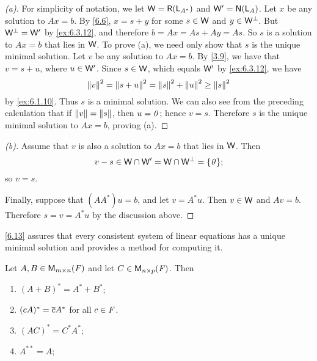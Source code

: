 \begin{proof}[(a)]
  For simplicity of notation, we let \(\W = \rg{\L_{A^*}}\) and \(\W' = \ns{\L_A}\).
  Let \(x\) be any solution to \(Ax = b\).
  By \cref{6.6}, \(x = s + y\) for some \(s \in \mathsf{W}\) and \(y \in \mathsf{W}^{\perp}\).
  But \(\mathsf{W}^{\perp} = \mathsf{W}'\) by \cref{ex:6.3.12}, and therefore \(b = Ax = As + Ay = As\).
  So \(s\) is a solution to \(Ax = b\) that lies in \(\mathsf{W}\).
  To prove (a), we need only show that \(s\) is the unique minimal solution.
  Let \(v\) be any solution to \(Ax = b\).
  By \cref{3.9}, we have that \(v = s + u\), where \(u \in \mathsf{W}'\).
  Since \(s \in \mathsf{W}\), which equals \(\mathsf{W}'\) by \cref{ex:6.3.12}, we have
  \[
    \left\lVert v\right\rVert^2 = \left\lVert s + u\right\rVert^2 = \left\lVert s\right\rVert^2 + \left\lVert u\right\rVert^2 \geq \left\lVert s\right\rVert^2
  \]
  by \cref{ex:6.1.10}.
  Thus \(s\) is a minimal solution.
  We can also see from the preceding calculation that if \(\left\lVert v\right\rVert = \left\lVert s\right\rVert\), then \(u = \mathit{0}\);
  hence \(v = s\).
  Therefore \(s\) is the unique minimal solution to \(Ax = b\), proving (a).
\end{proof}

\begin{proof}[(b)]
  Assume that \(v\) is also a solution to \(Ax = b\) that lies in \(\mathsf{W}\).
  Then
  \[
    v - s \in \W \cap \W' = \W \cap \W^{\perp} = \set{\zv};
  \]
  so \(v = s\).

  Finally, suppose that \((A A^*) u = b\), and let \(v = A^* u\).
  Then \(v \in \mathsf{W}\) and \(Av = b\).
  Therefore \(s = v = A^* u\) by the discussion above.
\end{proof}

\begin{note}
  \cref{6.13} assures that every consistent system of linear equations has a unique minimal solution and provides a method for computing it.
\end{note}

\exercisesection

\setcounter{ex}{4}
\begin{ex}\label{ex:6.3.5}
  Let \(A, B \in \mathsf{M}_{{m} \times n}({\mathit{F}})\) and let \(C \in \mathsf{M}_{{n} \times p}({\mathit{F}})\).
  Then
  \begin{enumerate}
    \item \((A + B)^* = A^* + B^*\);
    \item \((cA)^* = \overline{c} A^*\) for all \(c \in \mathit{F}\).
    \item \((AC)^* = C^* A^*\);
    \item \(A^{**} = A\);
  \end{enumerate}
\end{ex}

